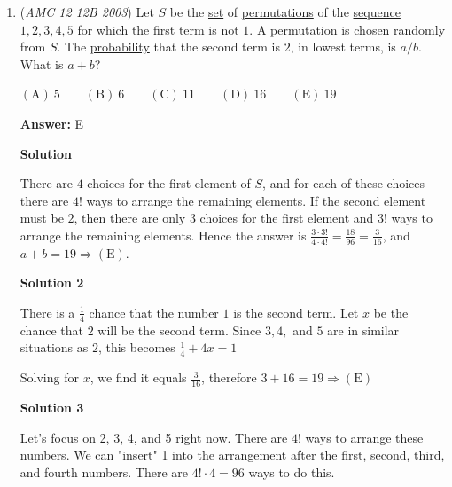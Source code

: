 \begin{enumerate}
 We can apply brute force to solve for $c$ and $d$ as the numbers aren't big. For the first congruence, we find that $25$ is the smallest number that satisfies, thus $c=5$. For the second congruence, we find that $40$ is the smallest number that satisfies, thus $d=8$. Summarising, we get $a+b+c+d=7+11+5+8=\boxed{\textbf{(B)}~31}$.

 


	\item (\textit{AMC 12 12B 2003}) Let $S$ be the \href{https://artofproblemsolving.com/wiki/index.php?title=Set}{set} of \href{https://artofproblemsolving.com/wiki/index.php?title=Permutation}{permutations} of the \href{https://artofproblemsolving.com/wiki/index.php?title=Sequence}{sequence} $1,2,3,4,5$ for which the first term is not $1$. A permutation is chosen randomly from $S$. The \href{https://artofproblemsolving.com/wiki/index.php?title=Probability}{probability} that the second term is $2$, in lowest terms, is $a/b$. What is $a+b$? 


 $\mathrm{(A)}\ 5 \qquad\mathrm{(B)}\ 6 \qquad\mathrm{(C)}\ 11 \qquad\mathrm{(D)}\ 16 \qquad\mathrm{(E)}\ 19$

 \textbf{Answer: }E



\textbf{Solution}

There are $4$ choices for the first element of $S$, and for each of these choices there are $4!$ ways to arrange the remaining elements. If the second element must be $2$, then there are only $3$ choices for the first element and $3!$ ways to arrange the remaining elements. Hence the answer is $\frac{3 \cdot 3!}{4 \cdot 4!} = \frac {18}{96} = \frac{3}{16}$, and $a+b=19 \Rightarrow \mathrm{(E)}$.

 


 



\textbf{Solution 2}

There is a $\frac {1}{4}$ chance that the number $1$ is the second term. Let $x$ be the chance that $2$ will be the second term. Since $3, 4,$ and $5$ are in similar situations as $2$, this becomes $\frac {1}{4} + 4x = 1$ 

 Solving for $x$, we find it equals $\frac {3}{16}$, therefore $3 + 16 = 19 \Rightarrow \mathrm{(E)}$




\textbf{Solution 3}

Let's focus on 2, 3, 4, and 5 right now. There are $4!$ ways to arrange these numbers. We can "insert" 1 into the arrangement after the first, second, third, and fourth numbers. There are $4! \cdot 4 = 96$ ways to do this. 


\end{enumerate}
